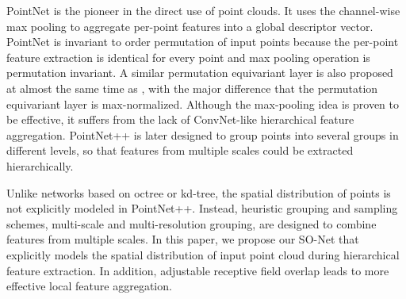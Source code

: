 \documentclass[10pt,twocolumn,letterpaper]{article}
\begin{document}
PointNet \cite{qi2016pointnet} is the pioneer in the direct use of point clouds. It uses the channel-wise max pooling to aggregate per-point features into a global descriptor vector. PointNet is invariant to order permutation of input points because the per-point feature extraction is identical for every point and max pooling operation is permutation invariant. A similar permutation equivariant layer \cite{ravanbakhsh2016deep} is also proposed at almost the same time as \cite{qi2016pointnet}, with the major difference that the permutation equivariant layer is max-normalized. Although the max-pooling idea is proven to be effective, it suffers from the lack of ConvNet-like hierarchical feature aggregation. PointNet++ \cite{qi2017pointnet++} is later designed to group points into several groups in different levels, so that features from multiple scales could be extracted hierarchically.

Unlike networks based on octree or kd-tree, the spatial distribution of points is not explicitly modeled in PointNet++. Instead, heuristic grouping and sampling schemes, \eg multi-scale and multi-resolution grouping, are designed to combine features from multiple scales. In this paper, we propose our SO-Net that explicitly models the spatial distribution of input point cloud during hierarchical feature extraction. In addition, adjustable receptive field overlap leads to more effective local feature aggregation.
\end{document}
